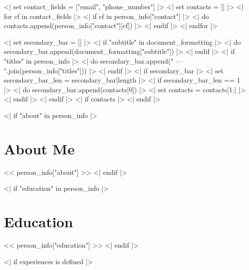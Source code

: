 \documentclass[10pt, letterpaper]{article}
\begin{document}
    
    <| set contact_fields = ["email", "phone_number"] |>
    <| set contacts = [] |>
    <| for cf in contact_fields |>
        <| if cf in person_info["contact"] |>
            <| do contacts.append(person_info["contact"][cf]) |>
        <| endif |>
    <| endfor |>
    
    <| set secondary_bar = [] |>
    <| if "subtitle" in document_formatting |>
        <| do secondary_bar.append(document_formatting["subtitle"]) |>
    <| endif |>
    <| if "titles" in person_info |>
        <| do secondary_bar.append(" --- ".join(person_info["titles"])) |>
    <| endif |>
    <| if secondary_bar |>
        <| set secondary_bar_len = secondary_bar|length |>
        <| if secondary_bar_len == 1 |>
            <| do secondary_bar.append(contacts[0]) |>
            <| set contacts = contacts[1:] |>
        <| endif |>
    <| endif |>
    <| if contacts |>
    <| endif |>
    
    <| if "about" in person_info |>
        \section{About Me}
        << person_info["about"] >>
        \vfill
    <| endif |>
    
    <| if "education" in person_info |>
        \section{Education}
        << person_info["education"] >>
        \vfill
    <| endif |>
    
    <| if experiences is defined |>
\end{document}
